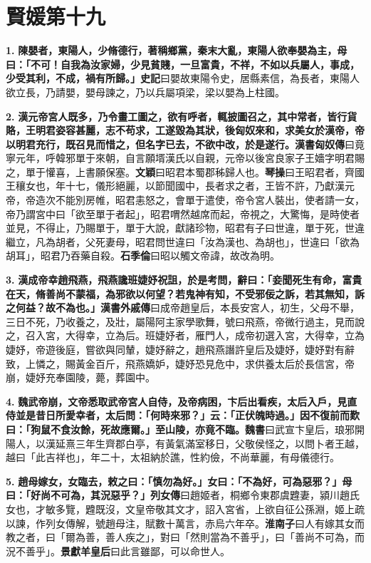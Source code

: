 \chapter{賢媛第十九}

\textbf{1.} \textbf{陳嬰者，東陽人，少脩德行，著稱鄉黨，秦末大亂，東陽人欲奉嬰為主，母曰：「不可！自我為汝家婦，少見貧賤，一旦富貴，不祥，不如以兵屬人，事成，少受其利，不成，禍有所歸。」}{\footnotesize \textbf{史記}曰嬰故東陽令史，居縣素信，為長者，東陽人欲立長，乃請嬰，嬰母諫之，乃以兵屬項梁，梁以嬰為上柱國。}

\textbf{2.} \textbf{漢元帝宮人既多，乃令畫工圖之，欲有呼者，輒披圖召之，其中常者，皆行貨賂，王明君姿容甚麗，志不苟求，工遂毀為其狀，後匈奴來和，求美女於漢帝，帝以明君充行，既召見而惜之，但名字已去，不欲中改，於是遂行。}{\footnotesize \textbf{漢書匈奴傳}曰竟寧元年，呼韓邪單于來朝，自言願壻漢氏以自親，元帝以後宮良家子王嬙字明君賜之，單于懽喜，上書願保塞。\textbf{文穎}曰昭君本蜀郡秭歸人也。\textbf{琴操}曰王昭君者，齊國王穰女也，年十七，儀形絕麗，以節聞國中，長者求之者，王皆不許，乃獻漢元帝，帝造次不能別房帷，昭君恚怒之，會單于遣使，帝令宮人裝出，使者請一女，帝乃謂宮中曰「欲至單于者起」，昭君喟然越席而起，帝視之，大驚悔，是時使者並見，不得止，乃賜單于，單于大說，獻諸珍物，昭君有子曰世違，單于死，世違繼立，凡為胡者，父死妻母，昭君問世違曰「汝為漢也、為胡也」，世違曰「欲為胡耳」，昭君乃吞藥自殺。\textbf{石季倫}曰昭以觸文帝諱，故改為明。}

\textbf{3.} \textbf{漢成帝幸趙飛燕，飛燕讒班婕妤祝詛，於是考問，辭曰：「妾聞死生有命，富貴在天，脩善尚不蒙福，為邪欲以何望？若鬼神有知，不受邪佞之訴，若其無知，訴之何益？故不為也。」}{\footnotesize \textbf{漢書外戚傳}曰成帝趙皇后，本長安宮人，初生，父母不舉，三日不死，乃收養之，及壯，屬陽阿主家學歌舞，號曰飛燕，帝微行過主，見而說之，召入宮，大得幸，立為后。班婕妤者，雁門人，成帝初選入宮，大得幸，立為婕妤，帝遊後庭，嘗欲與同輦，婕妤辭之，趙飛燕譖許皇后及婕妤，婕妤對有辭致，上憐之，賜黃金百斤，飛燕嬌妒，婕妤恐見危中，求供養太后於長信宮，帝崩，婕妤充奉園陵，薨，葬園中。}

\textbf{4.} \textbf{魏武帝崩，文帝悉取武帝宮人自侍，及帝病困，卞后出看疾，太后入戶，見直侍並是昔日所愛幸者，太后問：「何時來邪？」云：「正伏魄時過。」因不復前而歎曰：「狗鼠不食汝餘，死故應爾。」至山陵，亦竟不臨。}{\footnotesize \textbf{魏書}曰武宣卞皇后，琅邪開陽人，以漢延熹三年生齊郡白亭，有黃氣滿室移日，父敬侯怪之，以問卜者王越，越曰「此吉祥也」，年二十，太祖納於譙，性約儉，不尚華麗，有母儀德行。}

\textbf{5.} \textbf{趙母嫁女，女臨去，敕之曰：「慎勿為好。」女曰：「不為好，可為惡邪？」母曰：「好尚不可為，其況惡乎？」}{\footnotesize \textbf{列女傳}曰趙姬者，桐鄉令東郡虞韙妻，潁川趙氏女也，才敏多覽，韙既沒，文皇帝敬其文才，詔入宮省，上欲自征公孫淵，姬上疏以諫，作列女傳解，號趙母注，賦數十萬言，赤烏六年卒。\textbf{淮南子}曰人有嫁其女而教之者，曰「爾為善，善人疾之」，對曰「然則當為不善乎」，曰「善尚不可為，而況不善乎」。\textbf{景獻羊皇后}曰此言雖鄙，可以命世人。}

